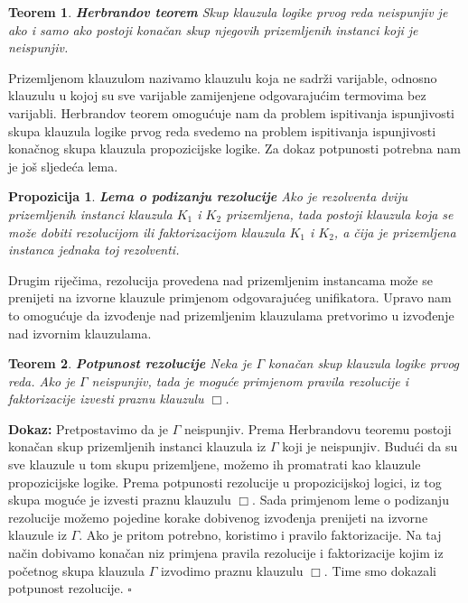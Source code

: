 \documentclass{article}
\theoremstyle{definition}
\theoremstyle{plain}
\newtheorem{teo}{Teorem}[section]
\newtheorem{lema}{Propozicija}[section]
\begin{document}
\begin{teo} \textbf{Herbrandov teorem}\newline
Skup klauzula logike prvog reda neispunjiv je ako i samo ako postoji konačan skup njegovih prizemljenih instanci koji je neispunjiv.
\end{teo} 
Prizemljenom klauzulom nazivamo klauzulu koja ne sadrži varijable, odnosno klauzulu u kojoj su sve varijable zamijenjene odgovarajućim termovima bez varijabli. Herbrandov teorem omogućuje nam da problem ispitivanja ispunjivosti skupa klauzula logike prvog reda svedemo na problem ispitivanja ispunjivosti konačnog skupa klauzula propozicijske logike. Za dokaz potpunosti potrebna nam je još sljedeća lema.
\begin{lema} \textbf{Lema o podizanju rezolucije}\newline
Ako je rezolventa dviju prizemljenih instanci klauzula $K_1$ i $K_2$ prizemljena, tada postoji klauzula koja se može dobiti rezolucijom ili faktorizacijom klauzula $K_1$ i $K_2$, a čija je prizemljena instanca jednaka toj rezolventi.
\end{lema}
Drugim riječima, rezolucija provedena nad prizemljenim instancama može se prenijeti na izvorne klauzule primjenom odgovarajućeg unifikatora. Upravo nam to omogućuje da izvođenje nad prizemljenim klauzulama pretvorimo u izvođenje nad izvornim klauzulama.
\begin{teo} \textbf{Potpunost rezolucije}\newline
Neka je $\Gamma$ konačan skup klauzula logike prvog reda. Ako je $\Gamma$ neispunjiv, tada je moguće primjenom pravila rezolucije i faktorizacije izvesti praznu klauzulu $\Box$.
\end{teo}

\textbf{Dokaz:}\newline
Pretpostavimo da je $\Gamma$ neispunjiv. Prema Herbrandovu teoremu postoji konačan skup prizemljenih instanci klauzula iz $\Gamma$ koji je neispunjiv. Budući da su sve klauzule u tom skupu prizemljene, možemo ih promatrati kao klauzule propozicijske logike. Prema potpunosti rezolucije u propozicijskoj logici, iz tog skupa moguće je izvesti praznu klauzulu $\Box$. Sada primjenom leme o podizanju rezolucije možemo pojedine korake dobivenog izvođenja prenijeti na izvorne klauzule iz $\Gamma$. Ako je pritom potrebno, koristimo i pravilo faktorizacije. Na taj način dobivamo konačan niz primjena pravila rezolucije i faktorizacije kojim iz početnog skupa klauzula $\Gamma$ izvodimo praznu klauzulu $\Box$. Time smo dokazali potpunost rezolucije. $\square$
\end{document}

